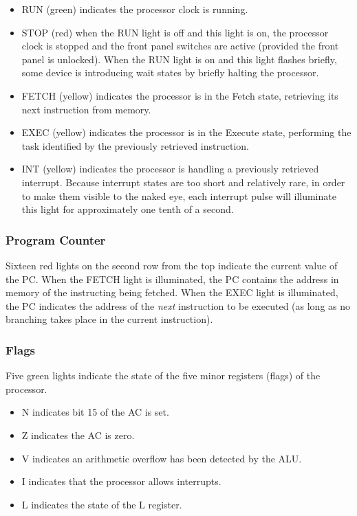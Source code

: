 \documentclass[11pt,a4paper,twocolumns]{article}
\newcommand{\lt}[1]{\textsf{#1}}
\newcommand\unit[1]{{#1}}
\newcommand\ALU{\unit{ALU}}
\newcommand\register[1]{\textsf{#1}}
\newcommand\A{\register{AC}}
\newcommand\Lreg{\register{L}}
\newcommand\PC{\register{PC}}
\begin{document}
\begin{itemize}
\item \lt{RUN} (green) indicates the processor clock is running.
\item \lt{STOP} (red) when the \lt{RUN} light is off and this light is
  on, the processor clock is stopped and the front panel switches are
  active (provided the front panel is unlocked). When the \lt{RUN}
  light is on and this light flashes briefly, some device is
  introducing wait states by briefly halting the processor.
\item \lt{FETCH} (yellow) indicates the processor is in the Fetch state,
  retrieving its next instruction from memory.
\item \lt{EXEC} (yellow) indicates the processor is in the Execute state,
  performing the task identified by the previously retrieved instruction.
\item \lt{INT} (yellow) indicates the processor is handling a previously
  retrieved interrupt. Because interrupt states are too short and relatively
  rare, in order to make them visible to the naked eye, each interrupt pulse
  will illuminate this light for approximately one tenth of a second.
\end{itemize}

\subsubsection{Program Counter}

Sixteen red lights on the second row from the top indicate the current value of
the \PC. When the \lt{FETCH} light is illuminated, the \PC{} contains the
address in memory of the instructing being fetched. When the \lt{EXEC} light is
illuminated, the \PC{} indicates the address of the {\em next\/} instruction to
be executed (as long as no branching takes place in the current instruction).

\subsubsection{Flags}

Five green lights indicate the state of the five minor registers (flags) of the
processor.

\begin{itemize}
\item \lt{N} indicates bit 15 of the \A{} is set.
\item \lt{Z} indicates the \A{} is zero.
\item \lt{V} indicates an arithmetic overflow has been detected by the \ALU.
\item \lt{I} indicates that the processor allows interrupts.
\item \lt{L} indicates the state of the \Lreg{} register.
\end{itemize}
\end{document}
